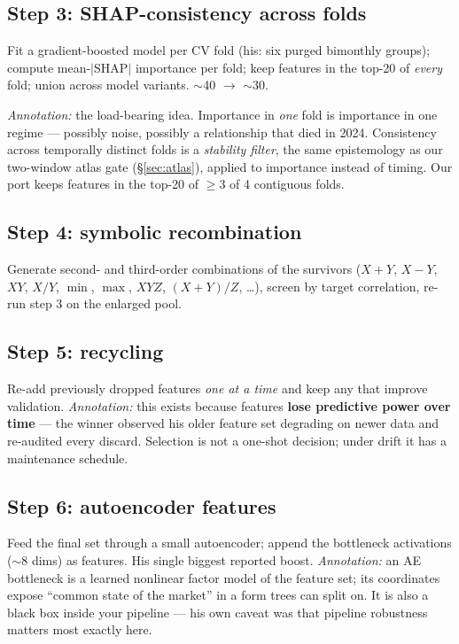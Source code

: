 \subsection{Step 3: SHAP-consistency across folds}

Fit a gradient-boosted model per CV fold (his: six purged bimonthly
groups); compute mean-$|$SHAP$|$ importance per fold; keep features in the
top-20 of \emph{every} fold; union across model variants. $\sim$40 $\to$
$\sim$30.

\emph{Annotation:} the load-bearing idea. Importance in \emph{one} fold is
importance in one regime --- possibly noise, possibly a relationship that
died in 2024. Consistency across temporally distinct folds is a
\emph{stability filter}, the same epistemology as our two-window atlas
gate (\S\ref{sec:atlas}), applied to importance instead of timing. Our
port keeps features in the top-20 of $\ge 3$ of 4 contiguous folds.

\subsection{Step 4: symbolic recombination}

Generate second- and third-order combinations of the survivors
($X + Y$, $X - Y$, $XY$, $X/Y$, $\min$, $\max$, $XYZ$, $(X+Y)/Z$, \dots),
screen by target correlation, re-run step 3 on the enlarged pool.

\subsection{Step 5: recycling}

Re-add previously dropped features \emph{one at a time} and keep any that
improve validation. \emph{Annotation:} this exists because features
\textbf{lose predictive power over time} --- the winner observed his older
feature set degrading on newer data and re-audited every discard.
Selection is not a one-shot decision; under drift it has a maintenance
schedule.

\subsection{Step 6: autoencoder features}

Feed the final set through a small autoencoder; append the bottleneck
activations ($\sim$8 dims) as features. His single biggest reported boost.
\emph{Annotation:} an AE bottleneck is a learned nonlinear factor model of
the feature set; its coordinates expose ``common state of the market'' in
a form trees can split on. It is also a black box inside your pipeline ---
his own caveat was that pipeline robustness matters most exactly here.

